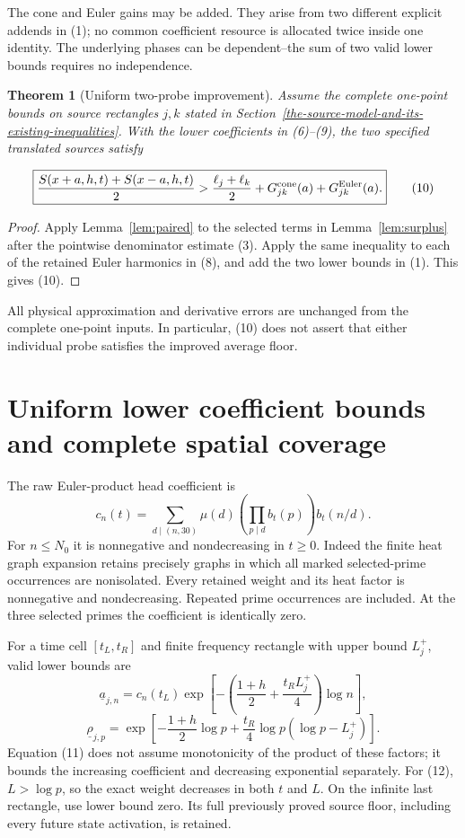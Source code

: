 \documentclass[11pt,a4paper]{article}
\newtheorem{theorem}{Theorem}
\begin{document}
The cone and Euler gains may be added. They arise from two different explicit
addends in (1); no common coefficient resource is allocated twice inside
one identity. The underlying phases can be dependent--the sum of two valid
lower bounds requires no independence.

\begin{theorem}[Uniform two-probe improvement]\label{thm:joint}
Assume the complete one-point bounds on source rectangles $j,k$ stated in
Section~\ref{the-source-model-and-its-existing-inequalities}. With the
lower coefficients in (6)--(9), the two specified translated sources satisfy

\[
\boxed{
\frac{S(x+a,h,t)+S(x-a,h,t)}2
>
\frac{\ell_j+\ell_k}{2}
+G^{\rm cone}_{jk}(a)+G^{\rm Euler}_{jk}(a).
}\tag{10}
\]
\end{theorem}
\begin{proof}
Apply Lemma~\ref{lem:paired} to the selected terms in
Lemma~\ref{lem:surplus} after the pointwise denominator estimate (3).
Apply the same inequality to each of the retained Euler harmonics in (8),
and add the two lower bounds in (1). This gives (10).
\end{proof}
All physical approximation and derivative errors are unchanged from the
complete one-point inputs. In particular, (10) does not assert that either
individual probe satisfies the improved average floor.

\section{Uniform lower coefficient bounds and complete spatial coverage}\label{uniform-lower-coefficient-bounds-and-complete-spatial-coverage}

The raw Euler-product head coefficient is
\[
 c_n(t)=\sum_{d\mid(n,30)}\mu(d)
        \left(\prod_{p\mid d}b_t(p)\right)b_t(n/d).
\]
For \(n\le N_0\) it is nonnegative and nondecreasing in \(t\ge0\).
Indeed the finite heat graph expansion retains precisely graphs in which
all marked selected-prime occurrences are nonisolated. Every retained
weight and its heat factor is nonnegative and nondecreasing. Repeated prime
occurrences are included. At the three selected primes the coefficient is
identically zero.

For a time cell \([t_L,t_R]\) and finite frequency rectangle with upper bound
\(L_j^+\), valid lower bounds are
\[
 \underline a_{j,n}
 =c_n(t_L)\exp\left[-\left(\frac{1+h}{2}
                   +\frac{t_RL_j^+}{4}\right)\log n\right],
\tag{11}
\]
\[
 \underline\rho_{j,p}
 =\exp\left[-\frac{1+h}{2}\log p
        +\frac{t_R}{4}\log p(\log p-L_j^+)\right].
\tag{12}
\]
Equation (11) does not assume monotonicity of the product of these factors;
it bounds the increasing coefficient and decreasing exponential separately.
For (12), \(L>\log p\), so the exact weight decreases in both \(t\) and \(L\).
On the infinite last rectangle, use lower bound zero. Its full previously
proved source floor, including every future state activation, is retained.
\end{document}
